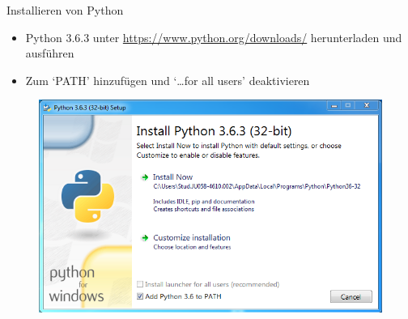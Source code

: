 \begin{frame}{Installieren von Python}
    \begin{itemize}
        \item Python 3.6.3 unter \url{https://www.python.org/downloads/} herunterladen 
        und ausführen
        \item Zum `PATH' hinzufügen und `\dots for all users' deaktivieren
    \end{itemize}
    \begin{figure}
        \includegraphics[scale=0.4]{images/python_install} 
    \end{figure}
\end{frame}

